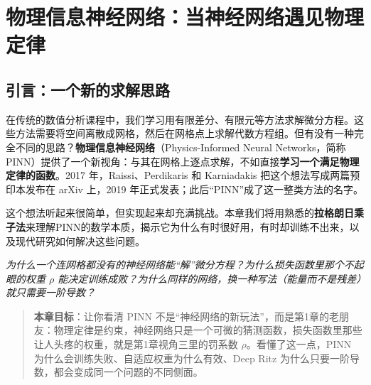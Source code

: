 \chapter{物理信息神经网络：当神经网络遇见物理定律}

\section*{引言：一个新的求解思路}



在传统的数值分析课程中，我们学习用有限差分、有限元等方法求解微分方程。这些方法需要将空间离散成网格，然后在网格点上求解代数方程组。但有没有一种完全不同的思路？\textbf{物理信息神经网络}（Physics-Informed Neural Networks，简称PINN）提供了一个新视角：与其在网格上逐点求解，不如直接\textbf{学习一个满足物理定律的函数}。2017 年，Raissi、Perdikaris 和 Karniadakis 把这个想法写成两篇预印本发布在 arXiv 上，2019 年正式发表；此后“PINN”成了这一整类方法的名字。

这个想法听起来很简单，但实现起来却充满挑战。本章我们将用熟悉的\textbf{拉格朗日乘子法}来理解PINN的数学本质，揭示它为什么有时很好用，有时却训练不出来，以及现代研究如何解决这些问题。

\vspace{0.3cm}
\noindent\textit{为什么一个连网格都没有的神经网络能“解”微分方程？为什么损失函数里那个不起眼的权重 $\rho$ 能决定训练成败？为什么同样的网络，换一种写法（能量而不是残差）就只需要一阶导数？}

\begin{quote}
\textbf{本章目标}：让你看清 PINN 不是“神经网络的新玩法”，而是第1章的老朋友：物理定律是约束，神经网络只是一个可微的猜测函数，损失函数里那些让人头疼的权重，就是第1章视角三里的罚系数 $\rho$。看懂了这一点，PINN 为什么会训练失败、自适应权重为什么有效、Deep Ritz 为什么只要一阶导数，都会变成同一个问题的不同侧面。
\end{quote}

